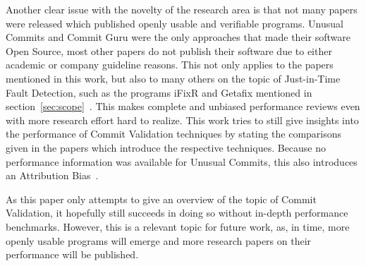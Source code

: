 Another clear issue with the novelty of the research area is that not many papers were released which published openly usable and verifiable programs. Unusual Commits and Commit Guru were the only approaches that made their software Open Source, most other papers do not publish their software due to either academic or company guideline reasons. This not only applies to the papers mentioned in this work, but also to many others on the topic of Just-in-Time Fault Detection, such as the programs iFixR and Getafix mentioned in section~\ref{sec:scope}~\cite{Koyuncu2019,Bader2019}. This makes complete and unbiased performance reviews even with more research effort hard to realize. This work tries to still give insights into the performance of Commit Validation techniques by stating the comparisons given in the papers which introduce the respective techniques. Because no performance information was available for Unusual Commits, this also introduces an Attribution Bias~\cite{Goyal2017}.

As this paper only attempts to give an overview of the topic of Commit Validation, it hopefully still succeeds in doing so without in-depth performance benchmarks. However, this is a relevant topic for future work, as, in time, more openly usable programs will emerge and more research papers on their performance will be published.





